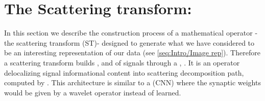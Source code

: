 \documentclass[a4paper,11pt]{report}
\begin{document}
\chapter{The Scattering transform:}
  \label{chap:ST}
  
	In this section we describe the construction process of a mathematical operator - the scattering transform (ST)- designed to generate what we have considered to be an interesting representation of our data (see \ref{seq:Intro/Image rep}). Therefore a scattering transform builds ,  and  of signals through a ,
  . It is an operator delocalizing signal informational content into scattering decomposition path, computed by .
  This architecture is similar to a  (CNN) where the synaptic weights would be given by a wavelet operator instead of learned.\\
  
\end{document}
